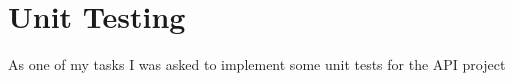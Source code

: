 \section{Unit Testing}{
	As one of my tasks I was asked to implement some unit tests for the API project
}